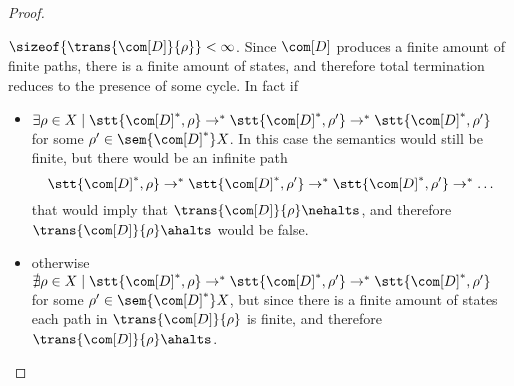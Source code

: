 \begin{proof}
\begin{itemize}
    \(\sizeof{\trans{\com[D]}{\rho}} < \infty\). Since \(\com[D]\)
    produces a finite amount of finite paths, there is a finite amount
    of states, and therefore total termination reduces to the presence
    of some cycle. In fact if
    \begin{itemize}
    \item
      \(\exists \rho \in X \mid \stt{\com[D]^*, \rho} \to^*
      \stt{\com[D]^*, \rho'} \to^* \stt{\com[D]^*, \rho'}\) for some
      \(\rho'\in \sem{\com[D]^*}X\). In this case the semantics would
      still be finite, but there would be an infinite path
      \[\stt{\com[D]^*, \rho} \to^* \stt{\com[D]^*, \rho'} \to^*
        \stt{\com[D]^*, \rho'} \to^* \dots\] that would imply that
      \(\trans{\com[D]}{\rho} \nehalts\), and therefore
      \(\trans{\com[D]}{\rho} \ahalts\) would be false.
    \item otherwise
      \(\nexists \rho \in X \mid \stt{\com[D]^*, \rho} \to^*
      \stt{\com[D]^*, \rho'} \to^* \stt{\com[D]^*, \rho'}\) for some
      \(\rho'\in \sem{\com[D]^*}X\), but since there is a finite
      amount of states each path in \(\trans{\com[D]}{\rho}\) is
      finite, and therefore \(\trans{\com[D]}{\rho}\ahalts\).
    \end{itemize}
  \end{itemize}
\end{proof}
